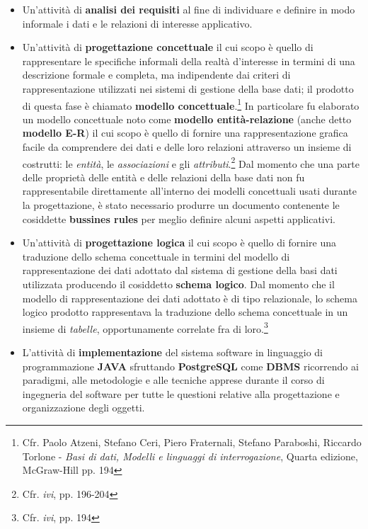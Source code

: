 \documentclass[10pt,a4paper, titlepage]{article}
\begin{document}
\begin{itemize}
\item Un'attività di \textbf{analisi dei requisiti} al fine di individuare e definire in modo informale i dati e le relazioni di interesse applicativo.
\item  Un'attività di \textbf{progettazione concettuale} il cui scopo è quello di rappresentare le specifiche informali della realtà d'interesse in termini di una descrizione formale e completa, ma indipendente dai criteri di rappresentazione utilizzati nei sistemi di gestione della base dati; il prodotto di questa fase è chiamato \textbf{modello concettuale}.\footnote{Cfr. Paolo Atzeni, Stefano Ceri, Piero Fraternali, Stefano Paraboshi, Riccardo Torlone - \textit{Basi di dati, Modelli e linguaggi di interrogazione}, Quarta edizione, McGraw-Hill pp. 194}  In particolare fu elaborato un modello concettuale noto come \textbf{modello entità-relazione} (anche detto \textbf{modello E-R}) il cui scopo è quello di fornire una rappresentazione grafica facile da comprendere dei dati e delle loro relazioni attraverso un insieme di costrutti: le \textit{entità}, le \textit{associazioni} e gli \textit{attributi}.\footnote{Cfr. \textit{ivi}, pp. 196-204}
Dal momento che una parte delle proprietà delle entità e delle relazioni della base dati non fu rappresentabile direttamente all'interno dei modelli concettuali usati durante la progettazione, è stato necessario produrre un documento contenente le cosiddette \textbf{bussines rules} per meglio definire alcuni aspetti applicativi.
\item Un'attività di \textbf{progettazione logica} il cui scopo è quello di fornire una traduzione dello schema concettuale in termini del modello di rappresentazione dei dati adottato dal sistema di gestione della basi dati utilizzata producendo il cosiddetto \textbf{schema logico}. Dal momento che il modello di rappresentazione dei dati adottato è di tipo relazionale, lo schema logico prodotto rappresentava la traduzione dello schema concettuale in un insieme di \textit{tabelle}, opportunamente correlate fra di loro.\footnote{Cfr. \textit{ivi}, pp. 194}
\item L'attività di \textbf{implementazione} del sistema software in linguaggio di programmazione \textbf{JAVA} sfruttando \textbf{PostgreSQL} come \textbf{DBMS} ricorrendo ai paradigmi, alle metodologie e alle tecniche apprese durante il corso di ingegneria del software per tutte le questioni relative alla progettazione e organizzazione degli oggetti.
\end{itemize}
\end{document}
